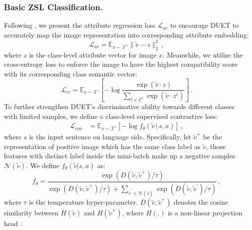 \documentclass[letterpaper]{article} \usepackage{aaai23}  \usepackage{times}  \usepackage{helvet}  \usepackage{courier}  \usepackage[hyphens]{url}  \usepackage{graphicx} \urlstyle{rm} \def\UrlFont{\rm}  \usepackage{natbib}  \usepackage{caption} \frenchspacing  \setlength{\pdfpagewidth}{8.5in}  \setlength{\pdfpageheight}{11in}  \usepackage{algorithm}
\begin{document}
\subsubsection{\textbf{Basic ZSL Classification.}}
Following \cite{Chen2021TransZero,DBLP:conf/nips/XuXWSA20}, we present the attribute regression loss
$\mathcal{L}_{ar}$ to encourage DUET to accurately map the image representation into  corresponding attribute embedding:
\begin{equation}
\mathcal{L}_{ar} = \mathbb{E}_{x \sim \mathcal{X}^s} \| \tilde{v} - z\|^2_2 \,,
\end{equation}
where $z$ is the class-level attribute vector for image $x$.
Meanwhile,
we utilize the cross-entropy loss to enforce the image to have the highest compatibility score with its corresponding class semantic vector:
\begin{equation}
\mathcal{L}_{cc}=\mathbb{E}_{x \sim \mathcal{X}^s} [-\log \frac{\exp \left(\tilde{v}\cdot  z\right)}{\sum_{\hat{c} \in \mathcal{C}^s} \exp \left(\tilde{v}\cdot  z^{\hat{c}}\right)}] \,.
\end{equation}
To further strengthen DUET's discriminative ability towards different classes with limited samples, we define a class-level supervised contrastive loss:
\begin{align}
\mathcal{L}_{con} &= \mathbb{E}_{x \sim \mathcal{X}^s} [-\log f_\theta(\tilde{v}\,|\, s,  x)]\,,
\end{align}
where $s$ is the input sentence on language side.
Specifically, let $\tilde{v}^{+}$ be the representation of positive image which has the same class label as $\tilde{v}$, those features with distinct label inside the mini-batch make up a negative samples $\mathcal{N}(\tilde{v})$. We define $f_\theta(\tilde{v}| s, x)$ as:
\begin{equation}\label{eq:cons}
f_\theta = \frac{\exp (D(\tilde{v}, \tilde{v}^{+}) / \tau)}{\exp (D(\tilde{v}, \tilde{v}^{+}) / \tau)+\sum_{\tilde{v}^{\prime} \in \mathcal{N}(\tilde{v})} \exp (D(\tilde{v}, \tilde{v}^{\prime}) / \tau)}\,,
\end{equation}
where $\tau$ is the temperature hyper-parameter. $D(\tilde{v}, \tilde{v}^{+})$ denotes the cosine similarity between $H(\tilde{v})$ and $H(\tilde{v}^{+})$, where $H(.)$ is a non-linear projection head \cite{DBLP:conf/icml/ChenK0H20}.
\end{document}
